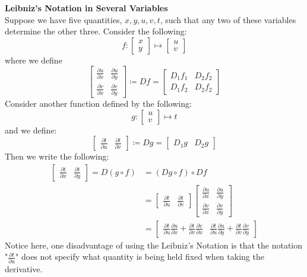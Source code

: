\documentclass[15pt]{book}
\theoremstyle{break}
\theoremstyle{break}
\begin{document}
\newpage
\textbf{Leibniz's Notation in Several Variables}\\
Suppose we have five quantities, $x,y,u,v,t$, such that any two of these variables determine the other three. Consider the following:
$$f:\begin{bmatrix}
x\\y \end{bmatrix} \mapsto \begin{bmatrix}
u\\v \end{bmatrix}
$$
where we define
$$\begin{bmatrix}
\frac{\partial u}{\partial x} &\frac{\partial u}{\partial y} \\
\frac{\partial v}{\partial x} &\frac{\partial v}{\partial y}
\end{bmatrix} \coloneqq 
Df = \begin{bmatrix}
D_1f_1 & D_2f_2 \\ D_1f_2 & D_2f_2
\end{bmatrix} 
$$
Consider another function defined by the following:
$$g:
\begin{bmatrix}
u\\v
\end{bmatrix}\mapsto t$$
and we define:
$$
\begin{bmatrix}
\frac{\partial t}{\partial u}& \frac{\partial t}{\partial v}
\end{bmatrix} \coloneqq
Dg = \begin{bmatrix}D_1g& D_2g
\end{bmatrix}
$$
Then we write the following:
\begin{align*}
\begin{bmatrix}
\frac{\partial t}{\partial x} & \frac{\partial t}{\partial y}
\end{bmatrix} = D(g\circ f) &= (Dg\circ f)\circ Df 
\\&= \begin{bmatrix}
\frac{\partial t}{\partial u}& \frac{\partial t}{\partial v}
\end{bmatrix} \begin{bmatrix}
\frac{\partial u}{\partial x}&\frac{\partial u}{\partial y}\\
\frac{\partial v}{\partial x}&\frac{\partial v}{\partial y}
\end{bmatrix}
\\&=
\begin{bmatrix}
\frac{\partial t}{\partial u}\frac{\partial u}{\partial x}+\frac{\partial t}{\partial v}\frac{\partial v}{\partial x}& \frac{\partial t}{\partial u}\frac{\partial u}{\partial y} + \frac{\partial t}{\partial v}\frac{\partial v}{\partial y}
\end{bmatrix}
\end{align*}
Notice here, one disadvantage of using the Leibniz's Notation is that the notation "$\frac{\partial t}{\partial u}$" does not specify what quantity is being held fixed when taking the derivative. \\
\end{document}
